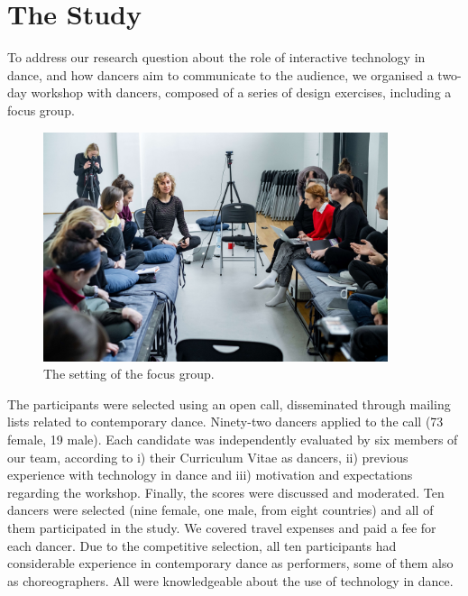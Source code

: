 \section{The Study}
To address our research question about the role of interactive technology in dance, and how dancers aim to communicate to the audience, we organised a two-day workshop with dancers, composed of a series of design exercises, including a focus group.


\begin{figure}
\centering
\includegraphics[width=0.9\textwidth]{Chapters/Figures/preliminary_actions/STL_focus_group_optimized.jpg}
\caption{The setting of the focus group.} \label{fig1}
\end{figure}

The participants were selected using an open call, disseminated through mailing lists related to contemporary dance. Ninety-two dancers applied to the call (73 female,  19 male). Each candidate was independently evaluated by six members of our team, according to i) their Curriculum Vitae as dancers, ii) previous experience with technology in dance and iii) motivation and expectations regarding the workshop. Finally, the scores were discussed and moderated. Ten dancers were selected (nine female, one male, from eight countries) and all of them participated in the study. We covered travel expenses and paid a fee for each dancer. Due to the competitive selection, all ten participants had considerable experience in contemporary dance as performers, some of them also as choreographers. All were knowledgeable about the use of technology in dance.

